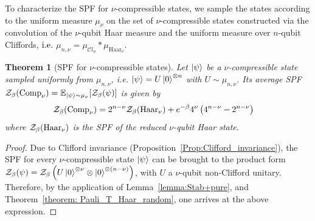 \documentclass[aps,pra,superscriptaddress,twocolumn,longbibliography]{revtex4-2}
\newtheorem{theorem}{\textbf{Theorem}}
\def\mZ{\mathcal{Z}}
\begin{document}
To characterize the SPF for $\nu$-compressible states, we sample the states according to the uniform measure $\mu_{\nu}$ on the set of $\nu$-compressible states constructed via the convolution of the $\nu$-qubit Haar measure and the uniform measure over $n$-qubit Cliffords, ${\rm i.e.}$ $\mu_{n,\nu}=\mu_{\mathcal{C}l_{n}}\ast \mu_{\text{Haar}_{\nu}}$.


\begin{theorem}[SPF for $\nu$-compressible states]\label{theorem: v_compressible_Pauli_T}
Let $\ket{\psi}$ be a $\nu$-compressible state sampled uniformly from $\mu_{n,\nu}$, i.e. $\ket{\psi}=U \ket{0}^{\otimes n}$ with $U \sim \mu_{n,\nu}$. Its average SPF $\mathcal{Z}_{\beta}({\rm Comp}_{\nu})=\mathbb{E}_{\ket{\psi}\sim \mu_{\nu}}[\mathcal{Z}_{\beta}(\psi)]$ is given by 
\begin{align*}
   \mathcal{Z}_{\beta}({\rm Comp}_{\nu})&= 2^{n-\nu}\mZ_{\beta}({\rm Haar_{\nu}})+e^{-\beta}4^{\nu}\left(4^{n-\nu}-2^{n-\nu} \right)
\end{align*}
%
where $\mathcal{Z}_{\beta}(\rm{Haar}_{\nu})$ is the SPF of the reduced $\nu$-qubit Haar state.    
\end{theorem}

\begin{proof}
    Due to Clifford invariance (Proposition~\ref{Prop:Clifford_invariance}), the SPF for every $\nu$-compressible state $\ket{\psi}$ can be brought to the product form $\mathcal{Z}_{\beta}(\psi)=\mathcal{Z}_{\beta}\left(U\ket{0}^{\otimes \nu}\otimes \ket{0}^{\otimes (n-\nu)}\right)$, with $U$ a $\nu$-qubit non-Clifford unitary. Therefore, by the application of Lemma~\ref{lemma:Stab+pure}, and Theorem~\ref{theorem: Pauli_T_Haar_random}, one arrives at the above expression.
\end{proof}
\end{document}
